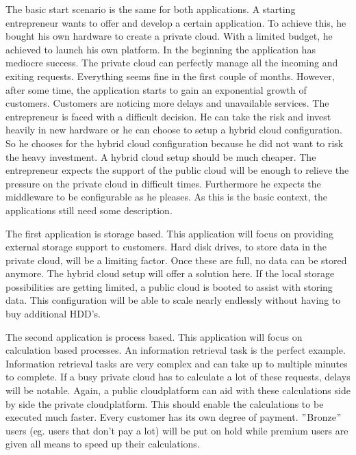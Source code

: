 \documentclass[journal]{IEEEtran}
\begin{document}
The basic start scenario is the same for both applications.
A starting entrepreneur wants to offer and develop a certain application.
To achieve this, he bought his own hardware to create a private cloud.
With a limited budget, he achieved to launch his own platform.
In the beginning the application has mediocre success.
The private cloud can perfectly manage all the incoming and exiting requests.
Everything seems fine in the first couple of months.
However, after some time, the application starts to gain an exponential growth of customers.
Customers are noticing more delays and unavailable services.
The entrepreneur is faced with a difficult decision.
He can take the risk and invest heavily in new hardware or he can choose to setup a hybrid cloud configuration.
So he chooses for the hybrid cloud configuration because he did not want to risk the heavy investment.
A hybrid cloud setup should be much cheaper.
The entrepreneur expects the support of the public cloud will be enough to relieve the pressure on the private cloud in difficult times.
Furthermore he expects the middleware to be configurable as he pleases.
As this is the basic context, the applications still need some description.\newline

The first application is storage based.
This application will focus on providing external storage support to customers.
Hard disk drives, to store data in the private cloud, will be a limiting factor.
Once these are full, no data can be stored anymore.
The hybrid cloud setup will offer a solution here.
If the local storage possibilities are getting limited, a public cloud is booted to assist with storing data.
This configuration will be able to scale nearly endlessly without having to buy additional HDD's.\newline

The second application is process based.
This application will focus on calculation based processes.
An information retrieval task is the perfect example.
Information retrieval tasks are very complex and can take up to multiple minutes to complete.
If a busy private cloud has to calculate a lot of these requests, delays will be notable.
Again, a public cloudplatform can aid with these calculations side by side the private cloudplatform.
This should enable the calculations to be executed much faster.
Every customer has its own degree of payment.
$"$Bronze$"$ users (eg. users that don't pay a lot) will be put on hold while premium users are given all means to speed up their calculations.\newline
\end{document}
